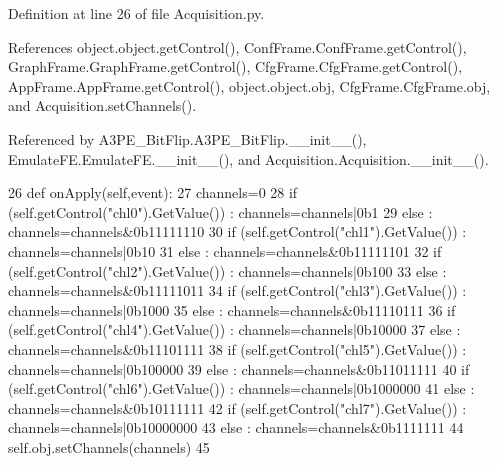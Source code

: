 Definition at line 26 of file Acquisition.\+py.



References object.\+object.\+get\+Control(), Conf\+Frame.\+Conf\+Frame.\+get\+Control(), Graph\+Frame.\+Graph\+Frame.\+get\+Control(), Cfg\+Frame.\+Cfg\+Frame.\+get\+Control(), App\+Frame.\+App\+Frame.\+get\+Control(), object.\+object.\+obj, Cfg\+Frame.\+Cfg\+Frame.\+obj, and Acquisition.\+set\+Channels().



Referenced by A3\+P\+E\+\_\+\+Bit\+Flip.\+A3\+P\+E\+\_\+\+Bit\+Flip.\+\_\+\+\_\+init\+\_\+\+\_\+(), Emulate\+F\+E.\+Emulate\+F\+E.\+\_\+\+\_\+init\+\_\+\+\_\+(), and Acquisition.\+Acquisition.\+\_\+\+\_\+init\+\_\+\+\_\+().


\begin{DoxyCode}
26     \textcolor{keyword}{def }onApply(self,event):
27         channels=0
28         \textcolor{keywordflow}{if} (self.getControl(\textcolor{stringliteral}{"chl0"}).GetValue()) : channels=channels|0b1
29         \textcolor{keywordflow}{else} : channels=channels&0b11111110
30         \textcolor{keywordflow}{if} (self.getControl(\textcolor{stringliteral}{"chl1"}).GetValue()) : channels=channels|0b10
31         \textcolor{keywordflow}{else} : channels=channels&0b11111101
32         \textcolor{keywordflow}{if} (self.getControl(\textcolor{stringliteral}{"chl2"}).GetValue()) : channels=channels|0b100
33         \textcolor{keywordflow}{else} : channels=channels&0b11111011
34         \textcolor{keywordflow}{if} (self.getControl(\textcolor{stringliteral}{"chl3"}).GetValue()) : channels=channels|0b1000
35         \textcolor{keywordflow}{else} : channels=channels&0b11110111
36         \textcolor{keywordflow}{if} (self.getControl(\textcolor{stringliteral}{"chl4"}).GetValue()) : channels=channels|0b10000
37         \textcolor{keywordflow}{else} : channels=channels&0b11101111
38         \textcolor{keywordflow}{if} (self.getControl(\textcolor{stringliteral}{"chl5"}).GetValue()) : channels=channels|0b100000
39         \textcolor{keywordflow}{else} : channels=channels&0b11011111
40         \textcolor{keywordflow}{if} (self.getControl(\textcolor{stringliteral}{"chl6"}).GetValue()) : channels=channels|0b1000000
41         \textcolor{keywordflow}{else} : channels=channels&0b10111111
42         \textcolor{keywordflow}{if} (self.getControl(\textcolor{stringliteral}{"chl7"}).GetValue()) : channels=channels|0b10000000
43         \textcolor{keywordflow}{else} : channels=channels&0b1111111
44         self.obj.setChannels(channels)            
45         
\end{DoxyCode}
\mbox{\label{classAcquisition_1_1Acquisition_aec0df3e0eea3f89f5c3057fac481be46}} 
